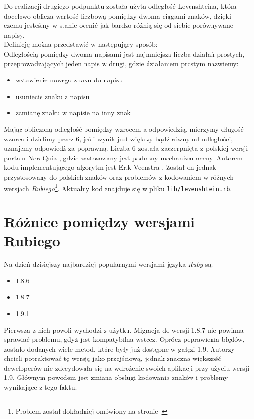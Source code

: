 \documentclass[12pt,twoside]{report}
\begin{document}
Do realizacji drugiego podpunktu została użyta odległość Levenshteina, która docelowo
oblicza wartość liczbową pomiędzy dwoma ciągami znaków, dzięki czemu jesteśmy w stanie
ocenić jak bardzo różnią się od siebie porównywane napisy.\\
Definicję można przedstawić w następujący sposób: \cite{levenshtein}\\
Odległością pomiędzy dwoma napisami jest najmniejsza liczba działań prostych,
przeprowadzających jeden napis w drugi, gdzie działaniem prostym nazwiemy:
\begin{itemize}
  \item wstawienie nowego znaku do napisu
  \item usunięcie znaku z napisu
  \item zamianę znaku w napisie na inny znak
\end{itemize}


Mając obliczoną odległość pomiędzy wzrocem a odpowiedzią, mierzymy długość wzorca i
dzielimy przez 6, jeśli wynik jest większy bądź równy od odległości, uznajemy odpowiedź
za poprawną. Liczba 6 została zaczerpnięta z polskiej wersji portalu NerdQuiz \cite{nerdquiz},
gdzie zastosowany jest podobny mechanizm oceny. Autorem kodu implementującego algorytm jest
Erik Veenstra \cite{veenstra}. Został on jednak przystosowany do polskich znaków oraz
problemów z kodowaniem w różnych wersjach \emph{Rubiego}\footnote{Problem został dokładniej
omówiony na stronie~\pageref{sec:ruby-versions}}. Aktualny kod znajduje się w pliku
\texttt{lib/levenshtein.rb}.

\section{Różnice pomiędzy wersjami Rubiego}\label{sec:ruby-version}
Na dzień dzisiejszy najbardziej popularnymi wersjami języka \emph{Ruby} są:

\begin{itemize}
  \item{1.8.6}
  \item{1.8.7}
  \item{1.9.1}
\end{itemize}


Pierwsza z nich powoli wychodzi z użytku. Migracja do wersji 1.8.7 nie powinna sprawiać
problemu, gdyż jest kompatybilna wstecz. Oprócz poprawienia błędów, zostało dodanych wiele
metod, które były już dostępne w gałęzi 1.9. Autorzy chcieli potraktować tę wersję jako
przejściową, jednak znaczna większość deweloperów nie zdecydowała się na wdrożenie swoich
aplikacji przy użyciu wersji 1.9. Głównym powodem jest zmiana obsługi kodowania znaków i
problemy wynikające z tego faktu.
\end{document}
